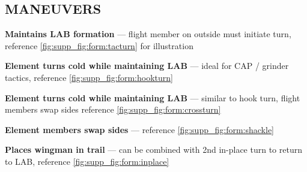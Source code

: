\subsection{MANEUVERS}

\begin{tcoloritemize}
    \textbf{Maintains LAB formation} --- flight member on outside must initiate turn,
    reference \cref{fig:supp_fig:form:tacturn} for illustration

    \textbf{Element turns cold while maintaining LAB} --- ideal for CAP / grinder tactics,
    reference \cref{fig:supp_fig:form:hookturn}

    \textbf{Element turns cold while maintaining LAB} --- similar to hook turn, flight members swap sides
    reference \cref{fig:supp_fig:form:crossturn}

    \blueitem[Shackle]
    \textbf{Element members swap sides} --- reference \cref{fig:supp_fig:form:shackle}

    \textbf{Places wingman in trail} --- can be combined with 2nd in-place turn to return to LAB,
    reference \cref{fig:supp_fig:form:inplace}
\end{tcoloritemize}


